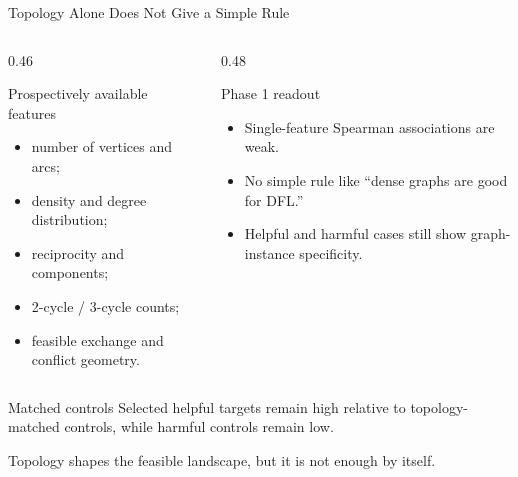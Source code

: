 \documentclass[aspectratio=169,10pt]{beamer}
\newcommand{\tightitems}{\setlength{\itemsep}{0.35em}}
\begin{document}
\begin{frame}{Topology Alone Does Not Give a Simple Rule}
  \small
  \begin{columns}[T,onlytextwidth]
    \begin{column}{0.46\textwidth}
      \begin{block}{Prospectively available features}
        \begin{itemize}\tightitems
          \item number of vertices and arcs;
          \item density and degree distribution;
          \item reciprocity and components;
          \item 2-cycle / 3-cycle counts;
          \item feasible exchange and conflict geometry.
        \end{itemize}
      \end{block}
    \end{column}

    \begin{column}{0.48\textwidth}
      \begin{alertblock}{Phase 1 readout}
        \begin{itemize}\tightitems
          \item Single-feature Spearman associations are weak.
          \item No simple rule like ``dense graphs are good for DFL.''
          \item Helpful and harmful cases still show graph-instance specificity.
        \end{itemize}
      \end{alertblock}
    \end{column}
  \end{columns}

  \vspace{0.35em}
  \begin{minipage}{0.94\textwidth}
    \begin{exampleblock}{Matched controls}
      \centering
      Selected helpful targets remain high relative to topology-matched controls, while harmful controls remain low.
    \end{exampleblock}
  \end{minipage}

  \vspace{0.45em}
  \centering
  {\scriptsize Topology shapes the feasible landscape, but it is not enough by itself.}
\end{frame}
\end{document}
